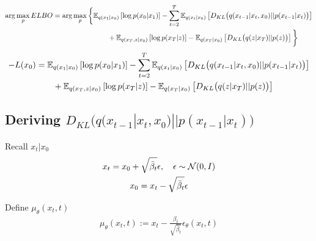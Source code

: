 \begin{align}
    \arg\max_p ELBO = \arg\max_p \bigg\{
    &\mathbb E_{q(x_1|x_0)}\left[
    \log p(x_0|x_1)\right]
    -
    \sum_{t=2}^T \mathbb E_{q(x_t|x_0)}\left[D_{KL}\big(q(x_{t-1}|x_t, x_0)||p(x_{t-1}|x_t)\big)\right]\\
    &\qquad +
    \mathbb E_{q(x_T,z|x_0)}\left[
    \log p(x_T|z)\right]
    -
    \mathbb E_{q(x_T|x_0)}\left[
    D_{KL}\big(q(z|x_T)||p(z)\big)\right]
    \bigg\}\\
\end{align}
\begin{align}
    - L(x_0) &= 
    \mathbb E_{q(x_1|x_0)}\left[
    \log p(x_0|x_1)\right]
    -
    \sum_{t=2}^T \mathbb E_{q(x_t|x_0)}\left[D_{KL}\big(q(x_{t-1}|x_t, x_0)||p(x_{t-1}|x_t)\big)\right]\\
    &\qquad +
    \mathbb E_{q(x_T,z|x_0)}\left[
    \log p(x_T|z)\right]
    -
    \mathbb E_{q(x_T|x_0)}\left[
    D_{KL}\big(q(z|x_T)||p(z)\big)\right]
\end{align}

\subsection{Deriving $D_{KL}\big(q(x_{t-1}|x_t, x_0)||p(x_{t-1}|x_t)\big)$}

Recall $x_t|x_0$
\begin{gather}
     x_t =x_0+\sqrt{\bar\beta_t}\epsilon,\quad 
     \epsilon\sim\mathcal N(0,I)\\
     x_0 = x_t - \sqrt{\bar\beta_t}\epsilon
\end{gather}

Define $\mu_\theta(x_t,t)$
\begin{gather}
    \mu_\theta(x_t,t):=x_t-\frac{\beta_t}{\sqrt{\bar\beta_t}}\epsilon_\theta(x_t,t)
\end{gather}

